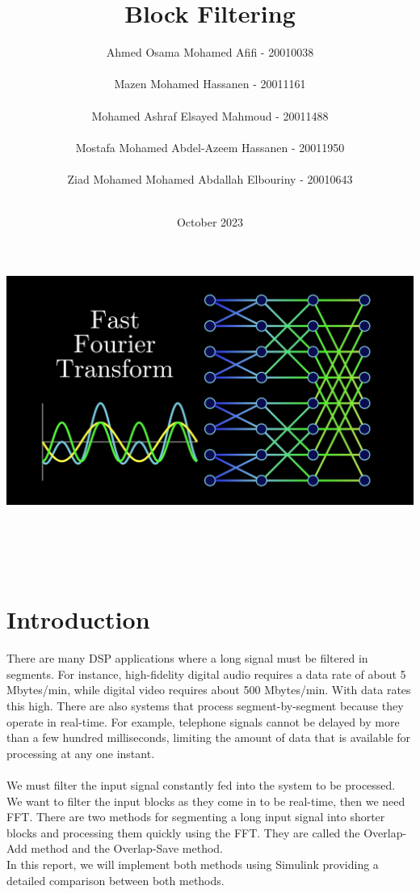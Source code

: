 \documentclass[12pt,a4paper]{article}
\title{\textbf{Block Filtering}}
\author{Ahmed Osama Mohamed Afifi - 20010038\\\\
Mazen Mohamed Hassanen   - 20011161\\\\
Mohamed Ashraf Elsayed Mahmoud   - 20011488\\\\
Mostafa Mohamed Abdel-Azeem Hassanen  - 20011950\\\\
Ziad Mohamed Mohamed Abdallah Elbouriny - 20010643\\\\}
\date{October 2023}
\begin{document}
\maketitle

\includegraphics[width=\textwidth]{Photos/maxresdefault.jpg}{\\ \\ \\ \\ \\}
\addtolength{\topmargin}{-60pt}
\addtolength{\textheight}{120pt}
\section*{Introduction}
\large{
There are many DSP applications where a long signal must be filtered in segments. For instance, high-fidelity digital audio requires a data rate of about 5 Mbytes/min, while digital video requires about 500 Mbytes/min. With data rates this high. There are also systems that process segment-by-segment because they operate in real-time. For example, telephone signals cannot be delayed by more than a few hundred milliseconds, limiting the amount of data that is available for processing at any one instant.\\ \\
We must filter the input signal constantly fed into the system to be processed. We want to filter the input blocks as they come
in to be real-time, then we need FFT. There are two methods for segmenting a long input signal into shorter blocks and processing them quickly using the FFT. They are called the Overlap-Add method and the Overlap-Save method.\\

In this report, we will implement both methods using Simulink providing a detailed comparison between both methods.}
\end{document}
